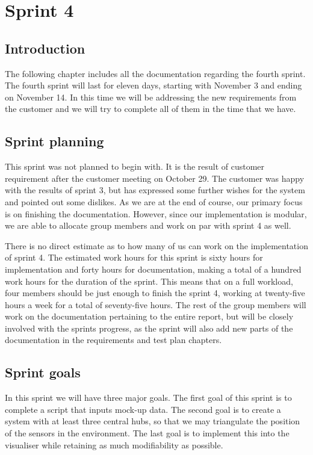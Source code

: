 \documentclass[../document]{subfiles}
\begin{document}
\section{Sprint 4}

\subsection{Introduction}

The following chapter includes all the documentation regarding the fourth sprint. The fourth sprint will last for eleven days, starting with November 3 and ending on November 14. In this time we will be addressing the new requirements from the customer and we will try to complete all of them in the time that we have. 

\subsection{Sprint planning}

This sprint was not planned to begin with. It is the result of customer requirement after the customer meeting on October 29. The customer was happy with the results of sprint 3, but has expressed some further wishes for the system and pointed out some dislikes. As we are at the end of course, our primary focus is on finishing the documentation. However, since our implementation is modular, we are able to allocate group members and work on par with sprint 4 as well.

There is no direct estimate as to how many of us can work on the implementation of sprint 4. The estimated work hours for this sprint is sixty hours for implementation and forty hours for documentation, making a total of a hundred work hours for the duration of the sprint. This means that on a full workload, four members should be just enough to finish the sprint 4, working at twenty-five hours a week for a total of seventy-five hours. The rest of the group members will work on the documentation pertaining to the entire report, but will be closely involved with the sprints progress, as the sprint will also add new parts of the documentation in the requirements and test plan chapters.

\subsection{Sprint goals}

In this sprint we will have three major goals. The first goal of this sprint is to complete a script that inputs mock-up data. The second goal is to create a system with at least three central hubs, so that we may triangulate the position of the sensors in the environment. The last goal is to implement this into the visualiser while retaining as much modifiability as possible.
\end{document}

